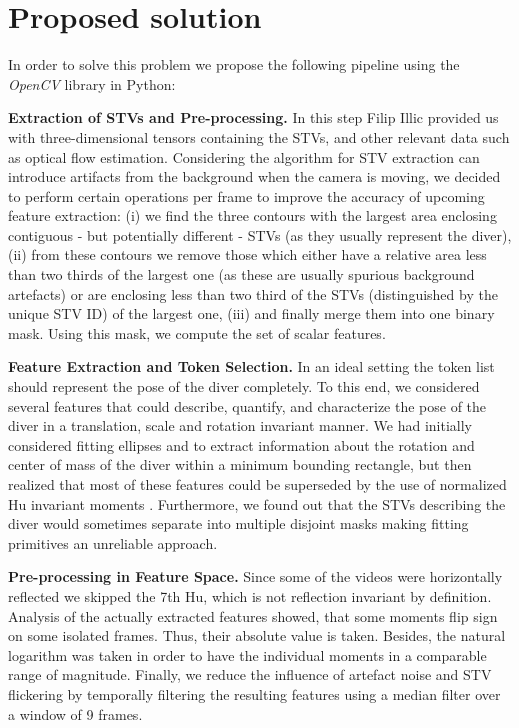 \documentclass[a4paper, textwidth=18cm, textheight=24cm, top=1cm, bottom=1cm, left=1cm, right=1cm10pt]{article}
\begin{document}
\section{Proposed solution}

In order to solve this problem we propose the following pipeline using the \emph{OpenCV} library in Python:

\textbf{Extraction of STVs and Pre-processing.} In this step Filip Illic provided us with three-dimensional tensors containing the STVs, and other relevant data such as optical flow estimation. Considering the algorithm for STV extraction can introduce artifacts from the background when the camera is moving, we decided to perform certain operations per frame to improve the accuracy of upcoming feature extraction: (i) we find the three contours with the largest area enclosing contiguous - but potentially different - STVs (as they usually represent the diver), (ii) from these contours we remove those which either have a relative area less than two thirds of the largest one (as these are usually spurious background artefacts) or are enclosing less than two third of the STVs (distinguished by the unique STV ID) of the largest one, (iii) and finally merge them into one binary mask. Using this mask, we compute the set of scalar features.

\textbf{Feature Extraction and Token Selection.} In an ideal setting the token list should represent the pose of the diver completely. To this end, we considered several features that could describe, quantify, and characterize the pose of the diver in a translation, scale and rotation invariant manner. We had initially considered fitting ellipses and to extract information about the rotation and center of mass of the diver within a minimum bounding rectangle, but then realized that most of these features could be superseded by the use of normalized Hu invariant moments \cite{hu62}. Furthermore, we found out that the STVs describing the diver would sometimes separate into multiple disjoint masks making fitting primitives an unreliable approach. 

\textbf{Pre-processing in Feature Space.} Since some of the videos were horizontally reflected we skipped the 7th Hu, which is not reflection invariant by definition. Analysis of the actually extracted features showed, that some moments flip sign on some isolated frames. Thus, their absolute value is taken. Besides, the natural logarithm was taken in order to have the individual moments in a comparable range of magnitude. Finally, we reduce the influence of artefact noise and STV flickering by temporally filtering the resulting features using a median filter over a window of 9 frames.
\end{document}
